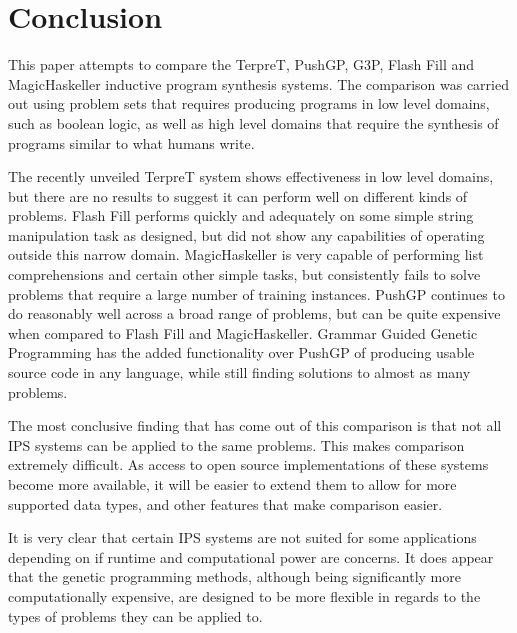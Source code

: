 \section{Conclusion}

This paper attempts to compare the TerpreT, PushGP, G3P, Flash Fill and MagicHaskeller inductive program synthesis systems. The comparison was carried out using problem sets that requires producing programs in low level domains, such as boolean logic, as well as high level domains that require the synthesis of programs similar to what humans write.

The recently unveiled TerpreT system shows effectiveness in low level domains, but there are no results to suggest it can perform well on different kinds of problems. Flash Fill performs quickly and adequately on some simple string manipulation task as designed, but did not show any capabilities of operating outside this narrow domain. MagicHaskeller is very capable of performing list comprehensions and certain other simple tasks, but consistently fails to solve problems that require a large number of training instances. PushGP continues to do reasonably well across a broad range of problems, but can be quite expensive when compared to Flash Fill and MagicHaskeller. Grammar Guided Genetic Programming has the added functionality over PushGP of producing usable source code in any language, while still finding solutions to almost as many problems.

The most conclusive finding that has come out of this comparison is that not all IPS systems can be applied to the same problems. This makes comparison extremely difficult. As access to open source implementations of these systems become more available, it will be easier to extend them to allow for more supported data types, and other features that make comparison easier.

It is very clear that certain IPS systems are not suited for some applications depending on if runtime and computational power are concerns. It does appear that the genetic programming methods, although being significantly more computationally expensive, are designed to be more flexible in regards to the types of problems they can be applied to.

